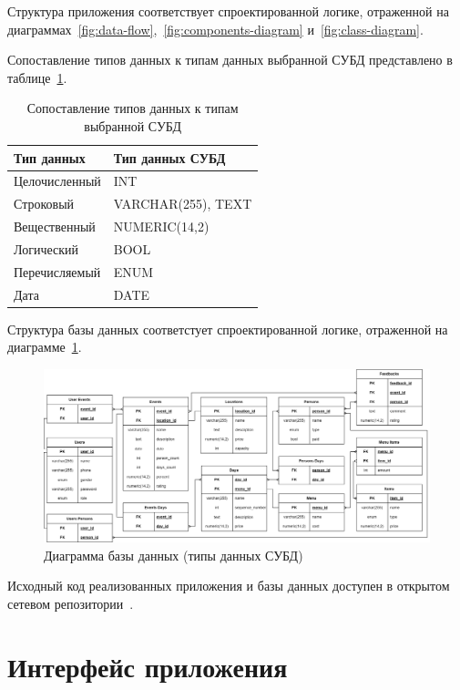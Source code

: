 Структура приложения соответствует спроектированной логике, отраженной на диаграммах~\ref{fig:data-flow},~\ref{fig:components-diagram} и~\ref{fig:class-diagram}.

Сопоставление типов данных к типам данных выбранной СУБД представлено в таблице~\ref{tbl:db-types}.

\begin{table}[h]
	\centering
	\caption{Сопоставление типов данных к типам выбранной СУБД}
	\label{tbl:db-types}
	\begin{tabularx}{\textwidth}{|X|X|}
		\hline
		\textbf{Тип данных} & \textbf{Тип данных СУБД} \\
		\hline
		Целочисленный & INT \\
		\hline
		Строковый & VARCHAR(255), TEXT \\
		\hline 
		Вещественный & NUMERIC(14,2) \\
		\hline
		Логический & BOOL \\
		\hline 
		Перечисляемый & ENUM \\
		\hline
		Дата & DATE \\
		\hline
	\end{tabularx}
\end{table}

Структура базы данных соответстует спроектированной логике, отраженной на диаграмме~\ref{fig:db-diagram}.

\begin{figure}[h!]
	\centering
	\includegraphics[width=1\textwidth]{images/db-diagram.png}
	\caption{Диаграмма базы данных (типы данных СУБД)} 
	\label{fig:db-diagram} 
\end{figure}

Исходный код реализованных приложения и базы данных доступен в открытом сетевом репозитории~\cite{lit17, lit18}.

\section{Интерфейс приложения}


